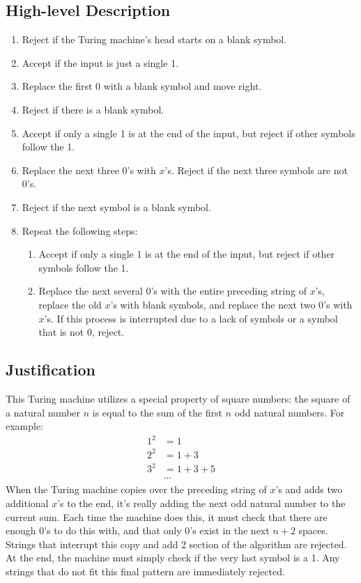 \documentclass[11pt letter]{article}
\begin{document}
\subsection{High-level Description}
\begin{enumerate}
    \item Reject if the Turing machine's head starts on a blank symbol.
    \item Accept if the input is just a single 1.
    \item Replace the first 0 with a blank symbol and move right.
    \item Reject if there is a blank symbol.
    \item Accept if only a single 1 is at the end of the input, but reject if other symbols follow the 1.
    \item Replace the next three 0's with $x$'s. Reject if the next three symbols are not 0's.
    \item Reject if the next symbol is a blank symbol.
    \item Repeat the following steps:
    \begin{enumerate}
        \item Accept if only a single 1 is at the end of the input, but reject if other symbols follow the 1.
        \item Replace the next several 0's with the entire preceding string of $x$'s, replace the old $x$'s with blank symbols, and replace the next two 0's with $x$'s. If this process is interrupted due to a lack of symbols or a symbol that is not 0, reject.
    \end{enumerate}
\end{enumerate}

\subsection{Justification}
This Turing machine utilizes a special property of square numbers: the square of a natural number $n$ is equal to the sum of the first $n$ odd natural numbers. For example:
    \begin{align*}
        1^2 &= 1 \\
        2^2 &= 1 + 3 \\
        3^2 &= 1 + 3 + 5 \\
        &\cdots
    \end{align*}
When the Turing machine copies over the preceding string of $x$'s and adds two additional $x$'s to the end, it's really adding the next odd natural number to the current sum. Each time the machine does this, it must check that there are enough 0's to do this with, and that only 0's exist in the next $n + 2$ spaces. Strings that interrupt this copy and add 2 section of the algorithm are rejected. At the end, the machine must simply check if the very last symbol is a 1. Any strings that do not fit this final pattern are immediately rejected.
\end{document}
